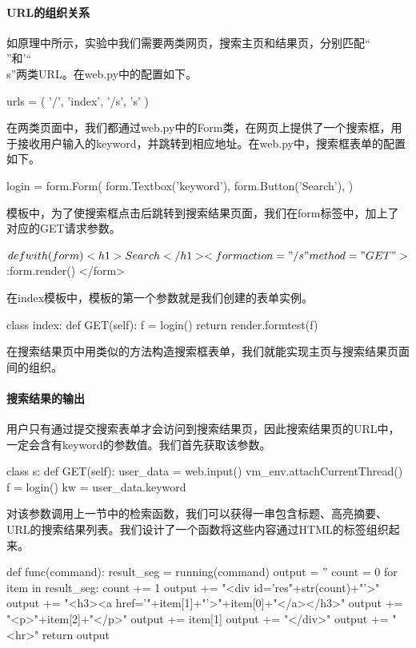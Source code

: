\documentclass{article}
\begin{document}
\paragraph{URL的组织关系}
如原理中所示，实验中我们需要两类网页，搜索主页和结果页，分别匹配“\\”和'“\\s”两类URL。在web.py中的配置如下。
\begin{python}
urls = (
    '/', 'index',
    '/s', 's'
)
\end{python}

在两类页面中，我们都通过web.py中的Form类，在网页上提供了一个搜索框，用于接收用户输入的keyword，并跳转到相应地址。在web.py中，搜索框表单的配置如下。
\begin{python}
login = form.Form(
    form.Textbox('keyword'),
    form.Button('Search'),
)
\end{python}

模板中，为了使搜索框点击后跳转到搜索结果页面，我们在form标签中，加上了对应的GET请求参数。
\begin{python}
$def with(form)
<h1>Search</h1>
<form action="/s" method="GET">
    $:form.render()
</form>
\end{python}

在index模板中，模板的第一个参数就是我们创建的表单实例。
\begin{python}
class index:
    def GET(self):
        f = login()
        return render.formtest(f)
\end{python}

在搜索结果页中用类似的方法构造搜索框表单，我们就能实现主页与搜索结果页面间的组织。

\paragraph{搜索结果的输出}
用户只有通过提交搜索表单才会访问到搜索结果页，因此搜索结果页的URL中，一定会含有keyword的参数值。我们首先获取该参数。
\begin{python}
class s:
    def GET(self):
        user_data = web.input()
        vm_env.attachCurrentThread()
        f = login()
        kw = user_data.keyword
\end{python}

对该参数调用上一节中的检索函数，我们可以获得一串包含标题、高亮摘要、URL的搜索结果列表。我们设计了一个函数将这些内容通过HTML的标签组织起来。
\begin{python}
def func(command):
    result_seg = running(command)
    output = ''
    count = 0
    for item in result_seg:
        count += 1
        output += "<div id='res"+str(count)+"'>"
        output += "<h3><a href='"+item[1]+"'>"+item[0]+"</a></h3>"
        output += "<p>"+item[2]+"</p>"
        output += item[1]
        output += "</div>"
        output += "<hr>"
    return output
\end{python}
\end{document}
